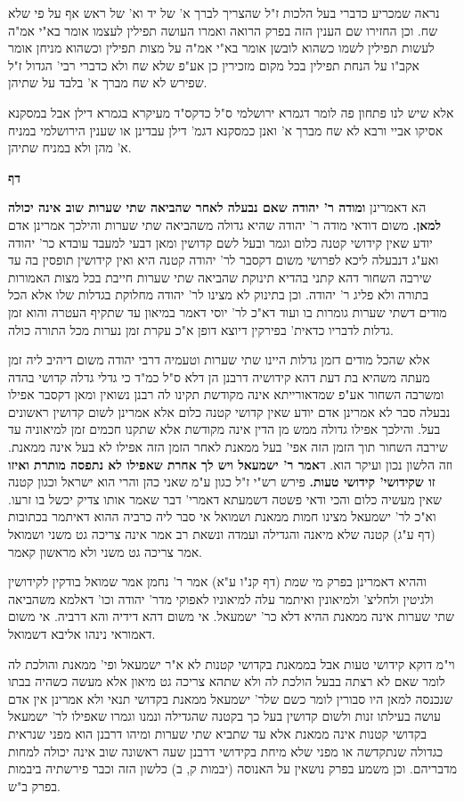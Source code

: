 \documentclass[12pt, openany]{book}
\newcommand{\sethebfont}{
\fontsize{10.5pt}{21.0pt} \selectfont
}
\newcommand{\twocol}[1]{
	{\sethebfont \begin{multicols}{2}
			#1
	\end{multicols}}	
}
\newcommand{\chapname}{}
\newcommand{\newchap}[1]{
	\addcontentsline{toc}{chapter}{#1}
	\renewcommand{\chapname}{#1}
		\begin{center}
			\textbf{%
\fontsize{16pt}{16pt}\selectfont
				#1}
		\end{center}
}
\begin{document}
{נראה שמכריע כדברי בעל הלכות ז"ל שהצריך לברך א' של יד וא' של ראש אף על פי שלא שח. וכן החזירו שם הענין הזה בפרק הרואה ואמרו העושה תפילין לעצמו אומר בא"י אמ"ה לעשות תפילין לשמו כשהוא לובשן אומר בא"י אמ"ה על מצות תפילין וכשהוא מניחן אומר אקב"ו על הנחת תפילין בכל מקום מזכירין כן אע"פ שלא שח ולא כדברי רבי' הגדול ז"ל שפירש לא שח מברך א' בלבד על שתיהן.\par  אלא שיש לנו פתחון פה לומר דגמרא ירושלמי ס"ל כדקס"ד מעיקרא בגמרא דילן אבל במסקנא אסיקו אביי ורבא לא שח מברך א' ואנן כמסקנא דגמ' דילן עבדינן או שענין הירושלמי במניח א' מהן ולא במניח שתיהן. 
\par}
\newchap{דף }
\twocol{הא דאמרינן \textbf{ומודה ר' יהודה שאם נבעלה לאחר שהביאה שתי שערות שוב אינה יכולה למאן.}  משום דודאי מודה ר' יהודה שהיא גדולה משהביאה שתי שערות והילכך אמרינן אדם יודע שאין קידושי קטנה כלום וגמר ובעל לשם קדושין ומאן דבעי למעבד עובדא כר' יהודה ואע"ג דנבעלה ליכא לפרושי משום דקסבר לר' יהודה קטנה היא ואין קידושין תופסין בה עד שירבה השחור דהא קתני בהדיא תינוקת שהביאה שתי שערות חייבת בכל מצות האמורות בתורה ולא פליג ר' יהודה. וכן בתינוק לא מצינו לר' יהודה מחלוקת בגדלות שלו אלא הכל מודים דשתי שערות גומרות בו ועוד דא"כ לר' יוסי דאמר במיאון עד שתקיף העטרה והוא זמן גדלות לדבריו כדאית' בפירקין דיוצא דופן א"כ עקרת זמן נערות מכל התורה כולה.\par  אלא שהכל מודים דזמן גדלות היינו שתי שערות וטעמיה דרבי יהודה משום דיהיב ליה זמן מעתה משהיא בת דעת דהא קידושיה דרבנן הן דלא ס"ל כמ"ד כי גדלי גדלה קדושי בהדה ומשרבה השחור אע"פ שמדאורייתא אינה מקודשת תקינו לה רבנן נשואין ומאן דקסבר אפילו נבעלה סבר לא אמרינן אדם יודע שאין קדושי קטנה כלום אלא אמרינן לשום קדושין ראשונים בעל. והילכך אפילו גדולה ממש מן הדין אינה מקודשת אלא שתקנו חכמים זמן למיאוניה עד שירבה השחור תוך הזמן הזה אפי' בעל ממאנת לאחר הזמן הזה אפילו לא בעל אינה ממאנת. וזה הלשון נכון ועיקר הוא. 
\parוהא ד\textbf{אמר ר' ישמעאל ויש לך אחרת שאפילו לא נתפסה מותרת ואיזו זו שקידושי' קידושי טעות.}  פירש רש"י ז"ל כגון ע"מ שאני כהן והרי הוא ישראל וכגון קטנה שאין מעשיה כלום והכי ודאי פשטה דשמעתא דאמרי' דבר שאמר אותו צדיק יכשל בו זרעו. וא"כ לר' ישמעאל מצינו חמות ממאנת ושמואל אי סבר ליה כרביה ההוא דאיתמר בכתובות (דף ע"ג) קטנה שלא מיאנה והגדילה ועמדה ונשאת רב אמר אינה צריכה גט משני ושמואל אמר צריכה גט משני ולא מראשון קאמר.\par  וההיא דאמרינן בפרק מי שמת (דף קנ"ו ע"א) אמר ר' נחמן אמר שמואל בודקין לקידושין ולגיטין ולחליצ' ולמיאונין ואיתמר עלה למיאוניו לאפוקי מדר' יהודה וכו' דאלמא משהביאה שתי שערות אינה ממאנת ההיא דלא כר' ישמעאל. אי משום דהא דידיה והא דרביה. אי משום דאמוראי נינהו אליבא דשמואל.\par וי"מ דוקא קידושי טעות אבל בממאנת בקדושי קטנות לא א"ר ישמעאל ופי' ממאנת והולכת לה לומר שאם לא רצתה בבעל הולכת לה ולא שתהא צריכה גט מיאון אלא מעשה כשהיה בבתו שנכנסה למאן היו סבורין לומר כשם שלר' ישמעאל ממאנת בקדושי תנאי ולא אמרינן אין אדם עושה בעילתו זנות ולשום קדושין בעל כך בקטנה שהגדילה ונמנו וגמרו שאפילו לר' ישמעאל בקדושי קטנות אינה ממאנת אלא עד שתביא שתי שערות ומיהו דרבנן הוא מפני שנראית כגדולה שנתקדשה או מפני שלא מיחת בקידושי דרבנן שעה ראשונה שוב אינה יכולה למחות מדבריהם. וכן משמע בפרק נושאין על האנוסה (יבמות ק, ב) כלשון הזה וכבר פירשתיה ביבמות בפרק ב"ש. 
}
\end{document}
